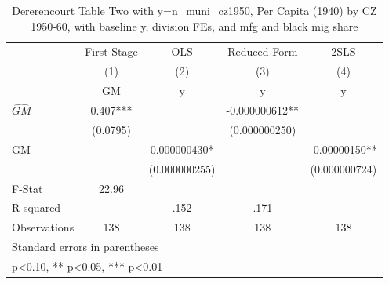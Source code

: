 \begin{table}[htbp]\centering
\def\sym#1{\ifmmode^{#1}\else\(^{#1}\)\fi}
\caption{Dererencourt Table Two with y=n\_muni\_cz1950, Per Capita (1940) by CZ 1950-60, with baseline y, division FEs, and mfg and black mig share}
\begin{tabular}{l*{4}{c}}
\toprule
                    & First Stage   &         OLS   &Reduced Form   &        2SLS   \\
                    &\multicolumn{1}{c}{(1)}&\multicolumn{1}{c}{(2)}&\multicolumn{1}{c}{(3)}&\multicolumn{1}{c}{(4)}\\
                    &\multicolumn{1}{c}{GM}&\multicolumn{1}{c}{y}&\multicolumn{1}{c}{y}&\multicolumn{1}{c}{y}\\
\midrule
$\hat{GM}$          &       0.407***&               &-0.000000612** &               \\
                    &    (0.0795)   &               &(0.000000250)   &               \\
\addlinespace
GM                  &               & 0.000000430*  &               & -0.00000150** \\
                    &               &(0.000000255)   &               &(0.000000724)   \\
\midrule
F-Stat              &       22.96   &               &               &               \\
R-squared           &               &        .152   &        .171   &               \\
Observations        &         138   &         138   &         138   &         138   \\
\bottomrule
\multicolumn{5}{l}{\footnotesize Standard errors in parentheses}\\
\multicolumn{5}{l}{\footnotesize * p<0.10, ** p<0.05, *** p<0.01}\\
\end{tabular}
\end{table}

